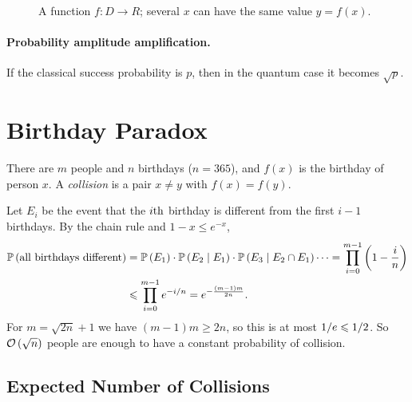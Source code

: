 \begin{figure}[ht]
    \centering
    \caption{A function $f \colon D \to R$; several $x$ can have the same value $y = f(x)$.}
    \label{fig:search-0903}
\end{figure}

\paragraph{Probability amplitude amplification.} If the classical success probability is $p$, then
in the quantum case it becomes $\sqrt{p}$.

\section{Birthday Paradox}

There are $m$ people and $n$ birthdays ($n = 365$), and $f(x)$ is the birthday of person $x$. A
\emph{collision} is a pair $x \neq y$ with $f(x) = f(y)$.

Let $E_i$ be the event that the $i\text{th}$ birthday is different from the first $i-1$ birthdays.
By the chain rule and $1 - x \leq e^{-x}$,
\begin{align*}
    \prob{\text{all birthdays different}}
     & = \prob{E_1} \cdot \prob{E_2 \given E_1} \cdot \prob{E_3 \given E_2 \cap E_1} \cdots
    = \prod_{i=0}^{m-1} \left(1 - \frac{i}{n}\right)                                        \\
     & \leq \prod_{i=0}^{m-1} e^{-\sfrac{i}{n}}
    = e^{-\frac{(m-1)m}{2n}}.
\end{align*}
For $m = \sqrt{2n} + 1$ we have $(m-1)m \geq 2n$, so this is at most $1/e \leqslant 1/2$.
So $\mathcal{O}\left(\sqrt{n}\right)$ people are enough to have a constant probability of collision.

\subsection{Expected Number of Collisions}

